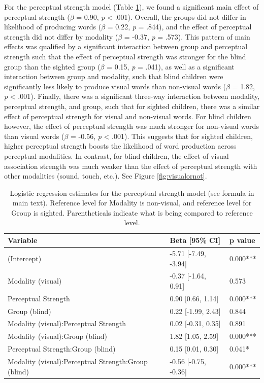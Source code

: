 \documentclass[
  man,floatsintext]{apa6}
\begin{document}
For the perceptual strength model (Table \ref{tab:ps-table}), we found a significant main effect of perceptual strength (\(\beta\) = 0.90, \emph{p} \textless{} .001). Overall, the groups did not differ in likelihood of producing words (\(\beta\) = 0.22, \emph{p} = .844), and the effect of perceptual strength did not differ by modality (\(\beta\) = -0.37, \emph{p} = .573). This pattern of main effects was qualified by a significant interaction between group and perceptual strength such that the effect of perceptual strength was stronger for the blind group than the sighted group (\(\beta\) = 0.15, \emph{p} = .041), as well as a significant interaction between group and modality, such that blind children were significantly less likely to produce visual words than non-visual words (\(\beta\) = 1.82, \emph{p} \textless{} .001). Finally, there was a significant three-way interaction between modality, perceptual strength, and group, such that for sighted children, there was a similar effect of perceptual strength for visual and non-visual words. For blind children however, the effect of perceptual strength was much stronger for non-visual words than visual words (\(\beta\) = -0.56, \emph{p} \textless{} .001). This suggests that for sighted children, higher perceptual strength boosts the likelihood of word production across perceptual modalities. In contrast, for blind children, the effect of visual association strength was much weaker than the effect of perceptual strength with other modalities (sound, touch, etc.). See Figure \ref{fig:visualornot}.

\begin{table}[H]

\caption{\label{tab:ps-table}Logistic regression estimates for the perceptual strength model (see formula in main text). Reference level for Modality is non-visual, and reference level for Group is sighted. Parentheticals indicate what is being compared to reference level.}
\centering
\begin{tabular}[t]{l|l|l}
\hline
Variable & Beta [95\% CI] & p value\\
\hline
(Intercept) & -5.71 [-7.49, -3.94] & 0.000***\\
\hline
Modality (visual) & -0.37 [-1.64, 0.91] & 0.573\\
\hline
Perceptual Strength & 0.90 [0.66, 1.14] & 0.000***\\
\hline
Group (blind) & 0.22 [-1.99, 2.43] & 0.844\\
\hline
Modality (visual):Perceptual Strength & 0.02 [-0.31, 0.35] & 0.891\\
\hline
Modality (visual):Group (blind) & 1.82 [1.05, 2.59] & 0.000***\\
\hline
Perceptual Strength:Group (blind) & 0.15 [0.01, 0.30] & 0.041*\\
\hline
Modality (visual):Perceptual Strength:Group (blind) & -0.56 [-0.75, -0.36] & 0.000***\\
\hline
\end{tabular}
\end{table}
\end{document}
